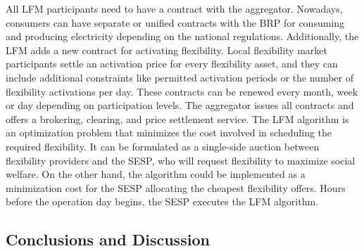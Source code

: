All LFM participants need to have a contract with the aggregator. Nowadays, consumers can have separate or unified contracts with the BRP for consuming and producing electricity depending on the national regulations. Additionally, the LFM adds a new contract for activating flexibility. Local flexibility market participants settle an activation price for every flexibility asset, and they can include additional constraints like permitted activation periods or the number of flexibility activations per day. These contracts can be renewed every month, week or day depending on participation levels. The aggregator issues all contracts and offers a
brokering, clearing, and price settlement service. The LFM algorithm is an optimization problem that minimizes the cost involved in scheduling the required flexibility. It can be formulated as a single-side auction between flexibility providers and the SESP, who will request flexibility to maximize social welfare. On the other hand, the algorithm could be implemented as a minimization cost for the SESP allocating the cheapest flexibility offers. Hours before the operation day begins, the SESP executes the LFM algorithm.

\subsection{Conclusions and Discussion}

